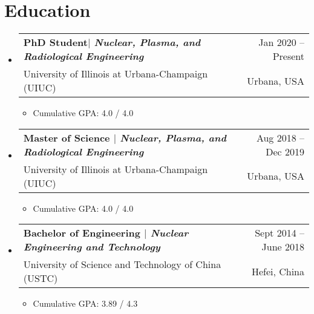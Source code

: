 \documentclass[letterpaper,11pt]{article} %
\makeatletter
\newcommand{\CVItem}[1]{
  \item\small{
    {#1 \vspace{-2pt}}
  }
}
\newcommand{\CVSubheading}[4]{
  \vspace{-2pt}\item
    \begin{tabular*}{0.97\textwidth}[t]{l@{\extracolsep{\fill}}r}
      \textbf{#1} & #2 \\
      \small#3 & \small #4 \\
    \end{tabular*}\vspace{-7pt}
}
\newcommand{\CVSubHeadingListStart}{\begin{itemize}[leftmargin=0.5cm, label={}]}
\newcommand{\CVSubHeadingListEnd}{\end{itemize}}
\newcommand{\CVItemListStart}{\begin{itemize}}
\newcommand{\CVItemListEnd}{\end{itemize}\vspace{-5pt}}
\makeatother
\begin{document}
\begin{comment}
This CV was written for specifically for positions I was applying for in
academia, and then modified to be a template.

A standard CV is about two pages long where as a resume in the US is one page.
sections can be added and removed here with this in mind. In my experience, 
education, and applicable work experience and skills are the most import things
to include on a resume. For a CV the Europass CV suggests the categories: Work
Experience, Education and Training, Language Skills, Digital Skills,
Communication and Interpersonal Skills, Conferences and Seminars, Creative Works
Driver's License, Hobbies and Interests, Honors and Awards, Management and
Leadership Skills, Networks and Memberships, Organizational Skills, Projects,
Publications, Recommendations, Social and Political Activities, Volunteering.

Your goal is to convey a who, what , when, where, why for every item you share. 
The who is obviously you, but I believe the rest should be done in that order.
For example below. An employer cares most about the degree held and typically 
less about the institution or where it is located (This is still good 
information though). Whatever order you choose be consistent throughout.
\end{comment}

\section{Education}
  \CVSubHeadingListStart
    \CVSubheading
      {{PhD Student$|$ \emph{\small{Nuclear, Plasma, and Radiological Engineering}}}}{Jan 2020 -- Present}
      {University of Illinois at Urbana-Champaign (UIUC)}{Urbana, USA}
      \CVItemListStart
        \CVItem{Cumulative GPA:  4.0 / 4.0}
      \CVItemListEnd
    \CVSubheading
      {{Master of Science $|$ \emph{\small{Nuclear, Plasma, and Radiological Engineering}}}}{Aug 2018 -- Dec 2019}
      {University of Illinois at Urbana-Champaign (UIUC)}{Urbana, USA}
       \CVItemListStart
        \CVItem{Cumulative GPA:  4.0 / 4.0}
      \CVItemListEnd
    \CVSubheading
      {{Bachelor of Engineering $|$ \emph{\small{Nuclear Engineering and Technology}}}}{Sept 2014 -- June 2018}
      {University of Science and Technology of China (USTC)}{Hefei, China}
       \CVItemListStart
        \CVItem{Cumulative GPA:  3.89 / 4.3}
      \CVItemListEnd
  \CVSubHeadingListEnd
\end{document}
